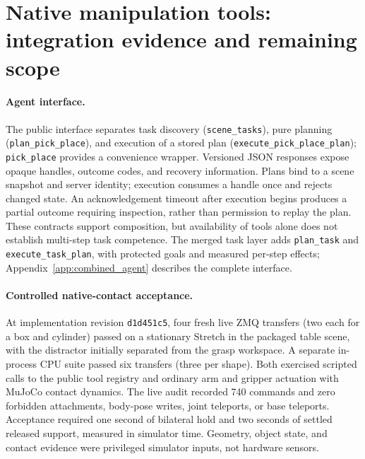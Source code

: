 \section{Native manipulation tools: integration evidence and remaining scope}
\label{app:native_tamp}

\paragraph{Agent interface.}
The public interface separates task discovery (\texttt{scene\_tasks}), pure planning
(\texttt{plan\_pick\_place}), and execution of a stored plan
(\texttt{execute\_pick\_place\_plan}); \texttt{pick\_place} provides a convenience
wrapper. Versioned JSON responses expose opaque handles, outcome codes, and
recovery information. Plans bind to a scene snapshot and server identity;
execution consumes a handle once and rejects changed state. An acknowledgement
timeout after execution begins produces a partial outcome requiring inspection,
rather than permission to replay the plan. These contracts support composition,
but availability of tools alone does not establish multi-step task competence. The merged task layer adds \texttt{plan\_task} and \texttt{execute\_task\_plan}, with protected goals and measured per-step effects; Appendix~\ref{app:combined_agent} describes the complete interface.

\paragraph{Controlled native-contact acceptance.}
At implementation revision \texttt{d1d451c5}, four fresh live ZMQ transfers
(two each for a box and cylinder) passed on a stationary Stretch in the packaged
table scene, with the distractor initially separated from the grasp workspace.
A separate in-process CPU suite passed six transfers (three per shape).
Both exercised scripted calls to the public tool registry and ordinary arm and
gripper actuation with MuJoCo contact dynamics. The live audit recorded 740
commands and zero forbidden attachments, body-pose writes, joint teleports, or
base teleports. Acceptance required one second of bilateral hold and two seconds
of settled released support, measured in simulator time. Geometry, object state,
and contact evidence were privileged simulator inputs, not hardware sensors.

